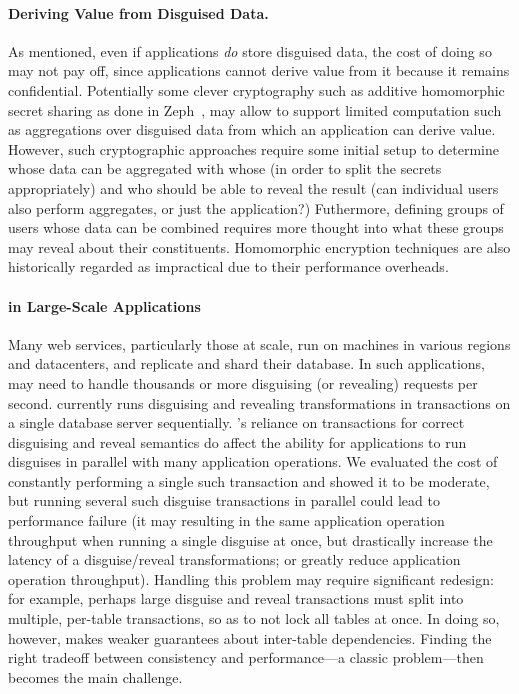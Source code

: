 \paragraph{Deriving Value from Disguised Data.} As mentioned, even if
applications \emph{do} store disguised data, the cost of doing so may not pay
off, since applications cannot derive value from it because it remains
confidential. 
%
Potentially some clever cryptography such as additive homomorphic secret sharing
as done in Zeph~\cite{zeph}, may allow \sys to support limited computation such
as aggregations over disguised data from which an application can derive value.
%
However, such cryptographic approaches require some initial setup to determine
whose data can be aggregated with whose (in order to split the secrets
appropriately) and who should be able to reveal the result (can individual users
also perform aggregates, or just the application?) Futhermore, defining groups
of users whose data can be combined requires more thought into what these groups
may reveal about their constituents.
%
Homomorphic encryption techniques are also historically regarded as impractical
due to their performance overheads.
%

\paragraph{\sys in Large-Scale Applications}
Many web services, particularly those at scale, run on machines in various
regions and datacenters, and replicate and shard their database.
%
In such applications, \sys may need to handle thousands or more disguising (or
revealing) requests per second.
%
\sys currently runs disguising and revealing transformations in transactions on
a single database server sequentially. 
%
\sys's reliance on transactions for correct disguising and reveal semantics do
affect the ability for applications to run disguises in parallel with many
application operations.
%
We evaluated the cost of constantly performing a single such transaction and
showed it to be moderate, but running several such disguise transactions in
parallel could lead to performance failure (\eg it may resulting in the same
application operation throughput when running a single disguise at once, but
drastically increase the latency of a disguise/reveal transformations; or
greatly reduce application operation throughput).
%
Handling this problem may require significant redesign: for example, perhaps
large disguise and reveal transactions must split into multiple, per-table
transactions, so as to not lock all tables at once. In doing so, however, \sys
makes weaker guarantees about inter-table dependencies. Finding the right
tradeoff between consistency and performance---a classic problem---then
becomes the main challenge.
%

